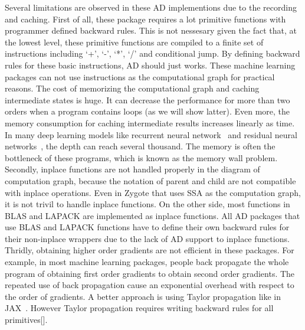 \documentclass[aps,twocolumn,longbibliography,english,superscriptaddress,prr]{revtex4-1}
\newcommand{\<}{\langle}
\renewcommand{\>}{\rangle}
\newcommand{\blue}[1]{[{\bf  \color{blue}{JG: #1}}]}
\theoremstyle{definition}\newtheorem{definition}{\textit{Definition}}
\begin{document}
    Several limitations are observed in these AD implementions due to the recording and caching. First of all, these package requires a lot primitive functions with programmer defined backward rules. This is not nessesary given the fact that, at the lowest level, these primitive functions are compiled to a finite set of instructions including `+', `-', `*', `/' and conditional jump. By defining backward rules for these basic instructions, AD should just works. These machine learning packages can not use instructions as the computational graph for practical reasons. The cost of memorizing the computational graph and caching intermediate states is huge. It can decrease the performance for more than two orders when a program contains loops (as we will show latter).
    Even more, the memory consumption for caching intermediate results increases linearly as time. In many deep learning models like recurrent neural network~\cite{Lipton2015} and residual neural networks~\cite{He2016}, the depth can reach several thousand. The memory is often the bottleneck of these programs, which is known as the memory wall problem.~\cite{memorywall}
    Secondly, inplace functions are not handled properly in the diagram of computation graph, because the notation of parent and child are not compatible with inplace operations.
 Even in Zygote that uses SSA as the computation graph, it is not trivil to handle inplace functions.
    On the other side, most functions in BLAS and LAPACK are implemented as inplace functions. All AD packages that use BLAS and LAPACK functions have to define their own backward rules for their non-inplace wrappers due to the lack of AD support to inplace functions.
    Thridly, obtaining higher order gradients are not efficient in these packages. For example, in most machine learning packages, people back propagate the whole program of obtaining first order gradients to obtain second order gradients. The repeated use of back propagation cause an exponential overhead with respect to the order of gradients. A better approach is using Taylor propagation like in JAX~\cite{Bettencourt2019}. However Taylor propagation requires writing backward rules for all primitives\blue{true?}. %

\end{document}
